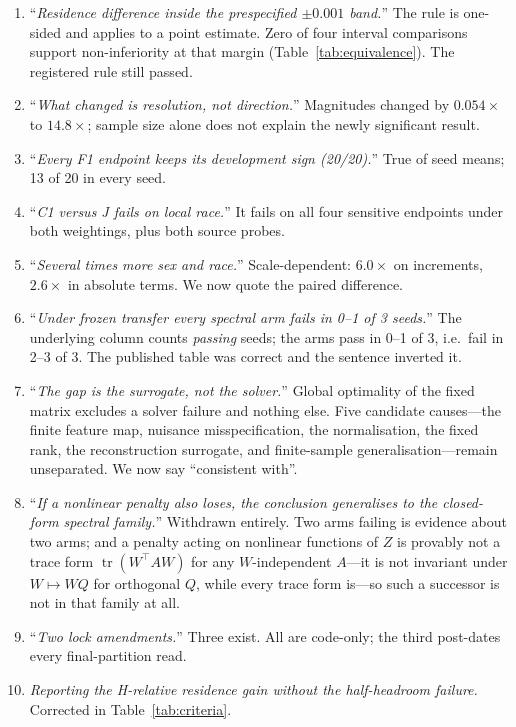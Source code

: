 \documentclass[10pt]{article}
\begin{document}
\begin{enumerate}\itemsep1pt
\item ``\emph{Residence difference inside the prespecified $\pm0.001$ band.}'' The rule is one-sided
and applies to a point estimate. Zero of four interval comparisons support non-inferiority at that
margin (Table~\ref{tab:equivalence}). The registered rule still passed.
\item ``\emph{What changed is resolution, not direction.}'' Magnitudes changed by $0.054\times$ to
$14.8\times$; sample size alone does not explain the newly significant result.
\item ``\emph{Every F1 endpoint keeps its development sign (20/20).}'' True of seed means; 13 of 20
in every seed.
\item ``\emph{C1 versus J fails on local race.}'' It fails on all four sensitive endpoints under both
weightings, plus both source probes.
\item ``\emph{Several times more sex and race.}'' Scale-dependent: $6.0\times$ on increments,
$2.6\times$ in absolute terms. We now quote the paired difference.
\item ``\emph{Under frozen transfer every spectral arm fails in 0--1 of 3 seeds.}'' The underlying
column counts \emph{passing} seeds; the arms pass in 0--1 of 3, i.e.\ fail in 2--3 of 3. The
published table was correct and the sentence inverted it.
\item ``\emph{The gap is the surrogate, not the solver.}'' Global optimality of the fixed matrix
excludes a solver failure and nothing else. Five candidate causes---the finite feature map, nuisance
misspecification, the normalisation, the fixed rank, the reconstruction surrogate, and finite-sample
generalisation---remain unseparated. We now say ``consistent with''.
\item ``\emph{If a nonlinear penalty also loses, the conclusion generalises to the closed-form
spectral family.}'' Withdrawn entirely. Two arms failing is evidence about two arms; and a penalty
acting on nonlinear functions of $Z$ is provably not a trace form $\operatorname{tr}(W^\top AW)$ for
any $W$-independent $A$---it is not invariant under $W\mapsto WQ$ for orthogonal $Q$, while every
trace form is---so such a successor is not in that family at all.
\item ``\emph{Two lock amendments.}'' Three exist. All are code-only; the third post-dates every
final-partition read.
\item \emph{Reporting the H-relative residence gain without the half-headroom failure.} Corrected in
Table~\ref{tab:criteria}.
\end{enumerate}
\end{document}
